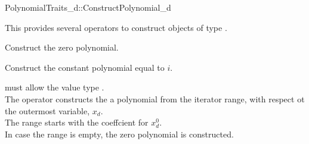 \begin{ccRefConcept}{PolynomialTraits_d::ConstructPolynomial_d}

\ccDefinition

This  provides several operators 
to construct objects of type .

\ccRefines 

\ccTypes


\ccOperations
{}
         {Construct the zero polynomial.}

         {Construct the constant polynomial equal to $i$. }

        {\ccPrecond {} must allow the value type 
        . \\
        
        The operator constructs the a polynomial from the iterator range, 
        with respect ot the outermost variable, $x_d$. \\
        The range starts with the coeffcient for $x_d^0$. \\
        In case the range is empty, the zero polynomial is constructed. 
        }



\ccSeeAlso

\\
\\

\end{ccRefConcept}
